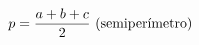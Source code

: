 \documentclass[preview]{standalone}
\begin{document}
\begin{align*}
\special{dvisvgm:raw <g id='unique000'>}p = \frac{a + b + c}{2} \text{ (semiperímetro)}\special{dvisvgm:raw </g>}
\end{align*}
\end{document}
